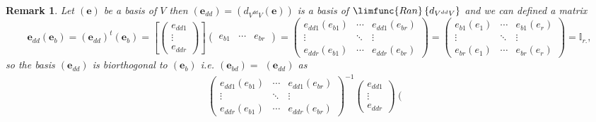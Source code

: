 \documentclass[aps,preprint]{revtex4}
\newtheorem{remark}[theorem]{Remark}
\begin{document}
\begin{remark}
Let $\left( \boldsymbol{e}\right) $ be a basis of $V$ then $\left( 
\boldsymbol{e}_{dd}\right) =\left( d_{V^{dd}V}\left( \overset{}{\boldsymbol{e%
}}\right) \right) $ is a basis of $\limfunc{Ran}\left\{ d_{V^{dd}V}\right\} $
and we can defined a matrix 
\begin{equation}
\boldsymbol{e}_{dd}\left( \boldsymbol{e}_{b}\right) =\left( \boldsymbol{e}%
_{dd}\right) ^{t}\left( \boldsymbol{e}_{b}\right) =\left[ \left( 
\begin{array}{c}
e_{dd1} \\ 
\vdots \\ 
e_{ddr}%
\end{array}%
\right) \right] \left( 
\begin{array}{ccc}
e_{b1} & \cdots & e_{br}%
\end{array}%
\right) =\left( 
\begin{array}{ccc}
e_{dd1}\left( e_{b1}\right) & \cdots & e_{dd1}\left( e_{br}\right) \\ 
\vdots & \ddots & \vdots \\ 
e_{ddr}\left( e_{b1}\right) & \cdots & e_{ddr}\left( e_{br}\right)%
\end{array}%
\right) =\left( 
\begin{array}{ccc}
e_{b1}\left( e_{1}\right) & \cdots & e_{b1}\left( e_{r}\right) \\ 
\vdots & \ddots & \vdots \\ 
e_{br}\left( e_{1}\right) & \cdots & e_{br}\left( e_{r}\right)%
\end{array}%
\right) =\mathbb{I}_{r.},
\end{equation}%
so the basis $\left( \boldsymbol{e}_{dd}\right) $ is biorthogonal to $\left( 
\boldsymbol{e}_{b}\right) $ i.e. $\left( \boldsymbol{e}_{bd}\right) =$ $%
\left( \boldsymbol{e}_{dd}\right) $ as 
\begin{gather}
\left( 
\begin{array}{ccc}
e_{dd1}\left( e_{b1}\right) & \cdots & e_{dd1}\left( e_{br}\right) \\ 
\vdots & \ddots & \vdots \\ 
e_{ddr}\left( e_{b1}\right) & \cdots & e_{ddr}\left( e_{br}\right)%
\end{array}%
\right) ^{-1}\left( 
\begin{array}{c}
e_{dd1} \\ 
\vdots \\ 
e_{ddr}%
\end{array}%
\right) \left( 
\begin{array}{ccc}

\end{array}
\end{gather}
\end{remark}
\end{document}
